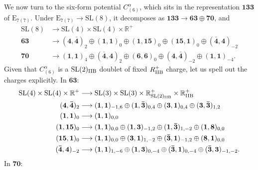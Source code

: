 \documentclass[11pt]{article}
\newcommand{\SL}{\ensuremath{\mathrm{SL}}\xspace}
\newcommand{\E}{\ensuremath{\mathrm{E}}\xspace}
\newcommand{\R}{\ensuremath{\mathbb{R}}\xspace}
\begin{document}
  We now turn to the six-form potential $C_{(6)}^{\alpha}$, which sits in the representation $\bm{133}$ of $\E_{7(7)}$. Under $\E_{7(7)} \rightarrow \SL(8)$, it decomposes as $\bm{133} \rightarrow \bm{63} \oplus \bm{70}$, and
  \begin{equation}
    \begin{aligned}
    \SL(8) & \longrightarrow \SL(4) \times \SL(4) \times \R^{+} \\
    \bm{63} & \longrightarrow (\bm{4},\bm{\bar{4}})_{2} \oplus (\bm{1},\bm{1})_{0} \oplus (\bm{1},\bm{15})_{0} \oplus (\bm{15},\bm{1})_{0} \oplus (\bm{\bar{4}},\bm{4})_{-2} \\
    \bm{70} & \longrightarrow (\bm{1},\bm{1})_{4} \oplus (\bm{\bar{4}},\bm{4})_{2} \oplus (\bm{6},\bm{6})_{0} \oplus (\bm{4},\bm{\bar{4}})_{-2} \oplus (\bm{1},\bm{1})_{-4}.
    \end{aligned}
  \end{equation}
  Given that $C_{(6)}^{\alpha}$ is a $\SL(2)_{\rm IIB}$ doublet of fixed $R_{\rm IIB}^{+}$ charge, let us spell out the charges explicitly. In $\bm{63}$:
  \begin{equation}
    \begin{aligned}
    \SL(4) \times \SL(4) \times \R^{+} & \longrightarrow \SL(3) \times \SL(3) \times \R^{+}_{\SL(2)_{\rm IIB}} \times \R^{+}_{\rm IIB} \\
    (\bm{4},\bm{\bar{4}})_{2} & \longrightarrow (\bm{1},\bm{1})_{-1,6} \oplus (\bm{1},\bm{\bar{3}})_{0,4} \oplus (\bm{3},\bm{1})_{0,4} \oplus (\bm{3},\bm{\bar{3}})_{1,2}\\
    (\bm{1},\bm{1})_{0} & \longrightarrow (\bm{1},\bm{1})_{0,0} \\
    (\bm{1},\bm{15})_{0} & \longrightarrow (\bm{1},\bm{1})_{0,0} \oplus (\bm{1},\bm{3})_{-1,2} \oplus (\bm{1},\bm{\bar{3}})_{1,-2} \oplus (\bm{1},\bm{8})_{0,0}\\
    (\bm{15},\bm{1})_{0} & \longrightarrow (\bm{1},\bm{1})_{0,0} \oplus (\bm{3},\bm{1})_{1,-2} \oplus (\bm{\bar{3}},\bm{1})_{-1,2} \oplus (\bm{8},\bm{1})_{0,0} \\
    (\bm{\bar{4}},\bm{4})_{-2} & \longrightarrow (\bm{1},\bm{1})_{1,-6} \oplus (\bm{1},\bm{3})_{0,-4} \oplus (\bm{\bar{3}},\bm{1})_{0,-4} \oplus (\bm{\bar{3}},\bm{3})_{-1,-2}.
    \end{aligned}
  \end{equation}
  In $\bm{70}$:
\end{document}
